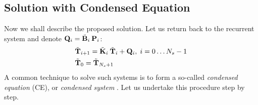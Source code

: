 \subsection{Solution with Condensed Equation}
Now we shall describe the proposed solution. Let us return back to the recurrent system and denote $\mathbf{Q}_i = \tilde{\mathbf{B}}_i \: \mathbf{P}_i$:
\begin{align}
  & \tilde{\mathbf{T}}_{i + 1} = \tilde{\mathbf{K}}_i \: \tilde{\mathbf{T}}_i + \mathbf{Q}_i, \; i = 0 \dots N_s - 1 \label{eq:ce-recurrent} \\
  & \tilde{\mathbf{T}}_0 = \tilde{\mathbf{T}}_{N_s + 1} \nonumber
\end{align}
A common technique to solve such systems is to form a so-called \emph{condensed equation} (CE), or \emph{condensed system} \cite{stoer2002}. Let us undertake this procedure step by step.

